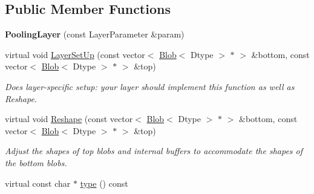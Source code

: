 \subsection*{Public Member Functions}
\begin{DoxyCompactItemize}
\item 
{\bfseries Pooling\+Layer} (const Layer\+Parameter \&param)\hypertarget{classcaffe_1_1PoolingLayer_a3bc79b6101f5e21bbbfa02b7726d650c}{}\label{classcaffe_1_1PoolingLayer_a3bc79b6101f5e21bbbfa02b7726d650c}

\item 
virtual void \hyperlink{classcaffe_1_1PoolingLayer_a5e1a46c850fcd18934309824208b31ff}{Layer\+Set\+Up} (const vector$<$ \hyperlink{classcaffe_1_1Blob}{Blob}$<$ Dtype $>$ $\ast$ $>$ \&bottom, const vector$<$ \hyperlink{classcaffe_1_1Blob}{Blob}$<$ Dtype $>$ $\ast$ $>$ \&top)
\begin{DoxyCompactList}\small\item\em Does layer-\/specific setup\+: your layer should implement this function as well as Reshape. \end{DoxyCompactList}\item 
virtual void \hyperlink{classcaffe_1_1PoolingLayer_a79a285029778124aca1c803d6cfec55f}{Reshape} (const vector$<$ \hyperlink{classcaffe_1_1Blob}{Blob}$<$ Dtype $>$ $\ast$ $>$ \&bottom, const vector$<$ \hyperlink{classcaffe_1_1Blob}{Blob}$<$ Dtype $>$ $\ast$ $>$ \&top)
\begin{DoxyCompactList}\small\item\em Adjust the shapes of top blobs and internal buffers to accommodate the shapes of the bottom blobs. \end{DoxyCompactList}\item 
virtual const char $\ast$ \hyperlink{classcaffe_1_1PoolingLayer_a0b4899ba1d3fe6f041dd5cc88a380c44}{type} () const \hypertarget{classcaffe_1_1PoolingLayer_a0b4899ba1d3fe6f041dd5cc88a380c44}{}\label{classcaffe_1_1PoolingLayer_a0b4899ba1d3fe6f041dd5cc88a380c44}


\end{DoxyCompactItemize}

